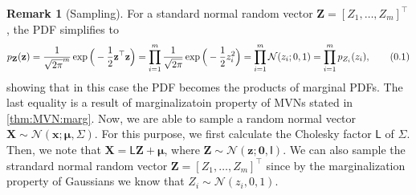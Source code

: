 \documentclass[10pt]{article}
\theoremstyle{definition}
\newtheorem*{rem}{Remark}
\newcommand\eqnum{\addtocounter{equation}{1}\tag{\arabic{section}.\arabic{equation}}}
\begin{document}
\begin{rem}[Sampling]
For a standard normal random vector $\mathbf{Z}=[Z_1,\dots,Z_m]^{\top}$, the PDF simplifies to
\begin{align*}
p_{\mathbf{Z}}(\mathbf{z}) 
=  \frac{1}{\sqrt{2\pi}^m} \exp\Big(-\frac{1}{2}\mathbf{z}^{\top}\mathbf{z}\Big) 
= \prod_{i=1}^{m}\frac{1}{\sqrt{2\pi}}\exp\Big(-\frac{1}{2}z_i^2\Big) 
= \prod_{i=1}^{m}\mathcal{N}(z_i; 0, 1)=\prod_{i=1}^{m}p_{Z_i}(z_i),
\eqnum
\label{eq:RV:SN:PDF}
\end{align*}
showing that in this case the PDF becomes the products of marginal PDFs. The last equality is a result of marginalizatoin property of MVNs stated in \cref{thm:MVN:marg}. Now, we are able to sample a random normal vector $\mathbf{X}\sim\mathcal{N}(\mathbf{x}; \boldsymbol{\mu}, \mathsf{\Sigma})$. For this purpose, we first calculate the Cholesky factor $\mathsf{L}$ of $\mathsf{\Sigma}$. Then, we note that $\mathbf{X} = \mathsf{L} \mathbf{Z} + \boldsymbol{\mu}$, where $\mathbf{Z}\sim\mathcal{N}(\mathbf{z}; \mathbf{0}, \mathsf{I})$. We can also sample the strandard normal random vector $\mathbf{Z}=[Z_1,\dots,Z_m]^{\top}$ since by the marginalization property of Gaussians we know that $Z_i\sim\mathcal{N}(z_i, 0, 1)$.
\label{exmp:sample}
\end{rem}
\end{document}
